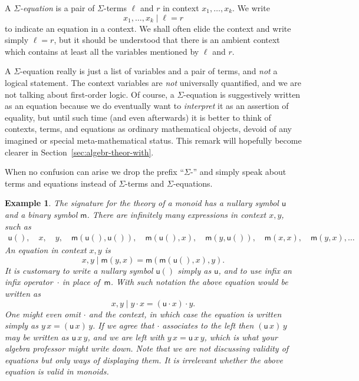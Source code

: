 \documentclass{amsart}
\newtheorem{example}[definition]{Example}
\begin{document}
A \emph{$\Sigma$-equation} is a pair of $\Sigma$-terms $\ell$ and $r$ in context
$x_1, \ldots, x_k$. We write
%
\begin{equation*}
  x_1, \ldots, x_k \mid \ell = r
\end{equation*}
%
to indicate an equation in a context. We shall often elide the context and write simply
$\ell = r$, but it should be understood that there is an ambient context which contains at
least all the variables mentioned by $\ell$ and $r$.

A $\Sigma$-equation really is just a list of variables and a pair of terms, and
\emph{not} a logical statement. The context variables are \emph{not} universally
quantified, and we are not talking about first-order logic. Of course, a
$\Sigma$-equation is suggestively written as an equation because we do
eventually want to \emph{interpret} it as an assertion of equality, but until
such time (and even afterwards) it is better to think of contexts, terms, and
equations as ordinary mathematical objects, devoid of any imagined or special
meta-mathematical status. This remark will hopefully become clearer in
Section~\ref{sec:algebr-theor-with}.

When no confusion can arise we drop the prefix ``$\Sigma$-'' and simply speak about
terms and equations instead of $\Sigma$-terms and $\Sigma$-equations.


\begin{example}
  \label{ex:monoid-signature}
  The signature for the theory of a monoid has a nullary symbol $\mathsf{u}$ and a binary
  symbol $\mathsf{m}$. There are infinitely many expressions in context $x, y$, such as
  \begin{align*}
    \mathsf{u}(),\quad
    x,\quad
    y,\quad
    \mathsf{m}(\mathsf{u}(), \mathsf{u}()),\quad
    \mathsf{m}(\mathsf{u}(), x),\quad
    \mathsf{m}(y, \mathsf{u}()),\quad
    \mathsf{m}(x, x),\quad
    \mathsf{m}(y, x),
    \ldots
  \end{align*}
  An equation in context $x, y$ is
  \begin{equation*}
    x, y \mid \mathsf{m}(y, x) = \mathsf{m}(\mathsf{m}(\mathsf{u}(), x), y).
  \end{equation*}
  It is customary to write a nullary symbol $\mathsf{u}()$ simply as $\mathsf{u}$, and to
  use infix an infix operator~$\cdot$ in place of~$\mathsf{m}$. With such notation the
  above equation would be written as
  \begin{equation*}
    x, y \mid y \cdot x = (\mathsf{u} \cdot x) \cdot y.
  \end{equation*}
  One might even omit $\cdot$ and the context, in which case the equation is
  written simply as $y \, x = (\mathsf{u} \, x) \, y$. If we agree that $\cdot$
  associates to the left then $(\mathsf{u} \, x) \, y$ may be written as
  $\mathsf{u} \, x \, y$, and we are left with $y \, x = \mathsf{u} \, x \, y$,
  which is what your algebra professor might write down. Note that we are
  \emph{not} discussing validity of equations but only ways of displaying them.
  It is irrelevant whether the above equation is valid in monoids.
\end{example}
\end{document}
